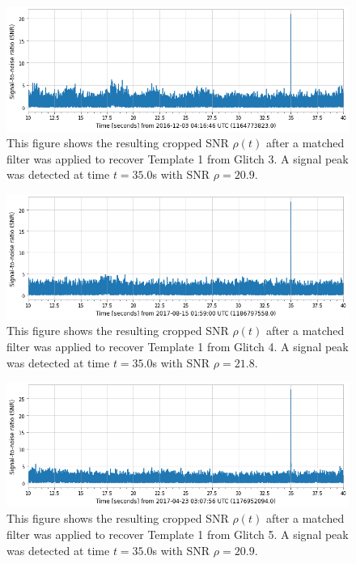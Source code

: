\documentclass[reprint,
letterpaper,
 amsmath,amssymb,
 aps,
]{revtex4-2}
\begin{document}
\begin{figure}[h]
\caption{This figure shows the resulting cropped SNR $\rho(t)$ after a matched filter was applied to recover Template 1 from Glitch 3. A signal peak was detected at time $t = 35.0$s with SNR $\rho = 20.9$.}
\includegraphics[scale = .33]{glitch 3 template 1.png}
\centering
\end{figure}
\begin{figure}[h]
\caption{This figure shows the resulting cropped SNR $\rho(t)$ after a matched filter was applied to recover Template 1 from Glitch 4. A signal peak was detected at time $t = 35.0$s with SNR $\rho = 21.8$.}
\includegraphics[scale = .33]{glitch 4 template 1.png}
\centering
\end{figure}
\begin{figure}[h]
\caption{This figure shows the resulting cropped SNR $\rho(t)$ after a matched filter was applied to recover Template 1 from Glitch 5. A signal peak was detected at time $t = 35.0$s with SNR $\rho = 20.9$.}
\includegraphics[scale = .33]{glitch 5 template 1.png}
\centering
\end{figure}
\end{document}

